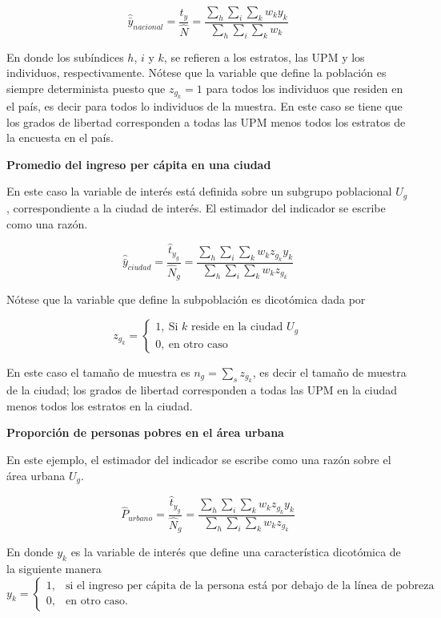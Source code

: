 \documentclass[
  12pt,
]{book}
\begin{document}
\[
\hat {\bar y}_{nacional} = \frac{\hat t_y}{\hat N} =\frac{\sum_h\sum_i\sum_k w_ky_{k}}{\sum_h\sum_i\sum_k w_k}
\]

En donde los subíndices \(h\), \(i\) y \(k\), se refieren a los estratos, las UPM y los individuos, respectivamente. Nótese que la variable que define la población es siempre determinista puesto que \(z_{g_k} = 1\) para todos los individuos que residen en el país, es decir para todos lo individuos de la muestra. En este caso se tiene que los grados de libertad corresponden a todas las UPM menos todos los estratos de la encuesta en el país.

\textbf{Promedio del ingreso per cápita en una ciudad}

En este caso la variable de interés está definida sobre un subgrupo poblacional \(U_g\), correspondiente a la ciudad de interés. El estimador del indicador se escribe como una razón.

\[
\hat {\bar y}_{ciudad}= \frac{\hat t_{y_g}}{\hat N_g} =\frac{\sum_h\sum_i\sum_k w_kz_{g_k}y_{k}}{\sum_h\sum_i\sum_k w_kz_{g_k}}
\]

Nótese que la variable que define la subpoblación es dicotómica dada por

\[ 
z_{g_k}=
\begin{cases}
1, \ \text{Si $k$ reside en la ciudad $U_g$} \\
0, \ \text{en otro caso}
\end{cases}
\]

En este caso el tamaño de muestra es \(n_g = \sum_s z_{g_k}\), es decir el tamaño de muestra de la ciudad; los grados de libertad corresponden a todas las UPM en la ciudad menos todos los estratos en la ciudad.

\textbf{Proporción de personas pobres en el área urbana}

En este ejemplo, el estimador del indicador se escribe como una razón sobre el área urbana \(U_g\).

\[
\hat{P}_{urbano} = \frac{\hat t_{y_g}}{\hat N_g} =\frac{\sum_h\sum_i\sum_k w_kz_{g_k}y_{k}}{\sum_h\sum_i\sum_k w_kz_{g_k}}
\]

En donde \(y_{k}\) es la variable de interés que define una característica dicotómica de la siguiente manera
\[
y_k=
\begin{cases}
1, &\text{si el ingreso per cápita de la persona está por debajo de la línea de pobreza}\\
0, &\text{en otro caso.}
\end{cases}
\]
\end{document}
